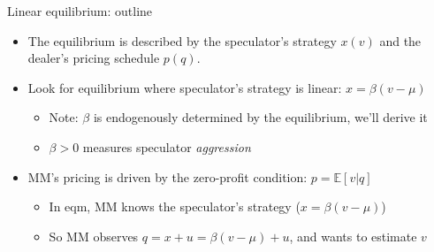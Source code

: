 \documentclass[english,10pt
,aspectratio=169
]{beamer}
\begin{document}
\begin{frame}{Linear equilibrium: outline}
\begin{itemize}
	\item The equilibrium is described by the speculator's strategy $x(v)$ and the dealer's pricing schedule $p(q)$.
	\pause
	\item Look for equilibrium where speculator's strategy is linear: \alert{$x=\beta(v-\mu)$}
	\begin{itemize}
		\item Note: $\beta$ is endogenously determined by the equilibrium, we'll derive it
		\item $\beta>0$ measures speculator \textit{aggression}
	\end{itemize}
	\item MM's pricing is driven by the zero-profit condition: $p=\mathbb{E}[v|q]$
	\begin{itemize}
		\item In eqm, MM knows the speculator's strategy ($x=\beta(v-\mu)$)
		\item So MM observes $q=x+u=\beta(v-\mu)+u$, and wants to \alert{estimate $v$}
	\end{itemize}
\end{itemize}
\end{frame}
\end{document}
